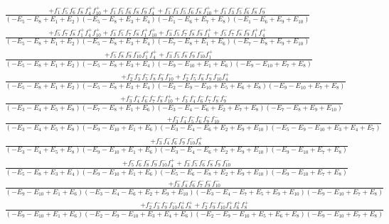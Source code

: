 \documentclass{article}
\begin{document}
\[\begin{array}{rcl}
\frac{+f_{1}^{-}f_{5}^{-}f_{6}^{-}f_{8}^{-}f_{4}^{+}f_{10}^{+}+f_{1}^{-}f_{5}^{-}f_{6}^{-}f_{8}^{-}f_{9}^{-}f_{4}^{+}+f_{1}^{-}f_{3}^{-}f_{5}^{-}f_{6}^{-}f_{8}^{-}f_{10}^{+}+f_{1}^{-}f_{3}^{-}f_{5}^{-}f_{6}^{-}f_{8}^{-}f_{9}^{-}}{(-E_{5}-E_{8}+E_{1}+E_{2})(-E_{5}-E_{8}+E_{3}+E_{4})(-E_{1}-E_{6}+E_{7}+E_{8})(-E_{1}-E_{6}+E_{9}+E_{10})}\\
\frac{+f_{5}^{-}f_{7}^{-}f_{8}^{-}f_{1}^{+}f_{4}^{+}f_{10}^{+}+f_{3}^{-}f_{5}^{-}f_{7}^{-}f_{8}^{-}f_{1}^{+}f_{10}^{+}+f_{3}^{-}f_{5}^{-}f_{7}^{-}f_{8}^{-}f_{9}^{-}f_{1}^{+}+f_{5}^{-}f_{7}^{-}f_{8}^{-}f_{9}^{-}f_{1}^{+}f_{4}^{+}}{(-E_{5}-E_{8}+E_{1}+E_{2})(-E_{5}-E_{8}+E_{3}+E_{4})(-E_{7}-E_{8}+E_{1}+E_{6})(-E_{7}-E_{8}+E_{9}+E_{10})}\\
\frac{+f_{5}^{-}f_{8}^{-}f_{9}^{-}f_{10}^{-}f_{1}^{+}f_{4}^{+}+f_{3}^{-}f_{5}^{-}f_{8}^{-}f_{9}^{-}f_{10}^{-}f_{1}^{+}}{(-E_{5}-E_{8}+E_{1}+E_{2})(-E_{5}-E_{8}+E_{3}+E_{4})(-E_{9}-E_{10}+E_{1}+E_{6})(-E_{9}-E_{10}+E_{7}+E_{8})}\\
\frac{+f_{2}^{-}f_{3}^{-}f_{5}^{-}f_{8}^{-}f_{9}^{-}f_{10}^{-}+f_{2}^{-}f_{5}^{-}f_{8}^{-}f_{9}^{-}f_{10}^{-}f_{4}^{+}}{(-E_{5}-E_{8}+E_{1}+E_{2})(-E_{5}-E_{8}+E_{3}+E_{4})(-E_{2}-E_{9}-E_{10}+E_{5}+E_{6}+E_{8})(-E_{9}-E_{10}+E_{7}+E_{8})}\\
\frac{+f_{3}^{-}f_{4}^{-}f_{6}^{-}f_{7}^{-}f_{8}^{-}f_{10}^{+}+f_{3}^{-}f_{4}^{-}f_{6}^{-}f_{7}^{-}f_{8}^{-}f_{9}^{-}}{(-E_{3}-E_{4}+E_{5}+E_{8})(-E_{7}-E_{8}+E_{1}+E_{6})(-E_{3}-E_{4}-E_{6}+E_{2}+E_{7}+E_{8})(-E_{7}-E_{8}+E_{9}+E_{10})}\\
\frac{+f_{3}^{-}f_{4}^{-}f_{5}^{-}f_{6}^{-}f_{9}^{-}f_{10}^{-}}{(-E_{3}-E_{4}+E_{5}+E_{8})(-E_{9}-E_{10}+E_{1}+E_{6})(-E_{3}-E_{4}-E_{6}+E_{2}+E_{9}+E_{10})(-E_{5}-E_{9}-E_{10}+E_{3}+E_{4}+E_{7})}\\
\frac{+f_{3}^{-}f_{4}^{-}f_{6}^{-}f_{9}^{-}f_{10}^{-}f_{8}^{+}}{(-E_{3}-E_{4}+E_{5}+E_{8})(-E_{9}-E_{10}+E_{1}+E_{6})(-E_{3}-E_{4}-E_{6}+E_{2}+E_{9}+E_{10})(-E_{9}-E_{10}+E_{7}+E_{8})}\\
\frac{+f_{5}^{-}f_{6}^{-}f_{8}^{-}f_{9}^{-}f_{10}^{-}f_{4}^{+}+f_{3}^{-}f_{5}^{-}f_{6}^{-}f_{8}^{-}f_{9}^{-}f_{10}^{-}}{(-E_{5}-E_{8}+E_{3}+E_{4})(-E_{9}-E_{10}+E_{1}+E_{6})(-E_{5}-E_{6}-E_{8}+E_{2}+E_{9}+E_{10})(-E_{9}-E_{10}+E_{7}+E_{8})}\\
\frac{+f_{3}^{-}f_{4}^{-}f_{6}^{-}f_{7}^{-}f_{9}^{-}f_{10}^{-}}{(-E_{9}-E_{10}+E_{1}+E_{6})(-E_{3}-E_{4}-E_{6}+E_{2}+E_{9}+E_{10})(-E_{3}-E_{4}-E_{7}+E_{5}+E_{9}+E_{10})(-E_{9}-E_{10}+E_{7}+E_{8})}\\
\frac{+f_{2}^{-}f_{3}^{-}f_{9}^{-}f_{10}^{-}f_{6}^{+}f_{8}^{+}+f_{2}^{-}f_{9}^{-}f_{10}^{-}f_{4}^{+}f_{6}^{+}f_{8}^{+}}{(-E_{9}-E_{10}+E_{1}+E_{6})(-E_{2}-E_{9}-E_{10}+E_{3}+E_{4}+E_{6})(-E_{2}-E_{9}-E_{10}+E_{5}+E_{6}+E_{8})(-E_{9}-E_{10}+E_{7}+E_{8})}\\

\end{array}\]
\end{document}
